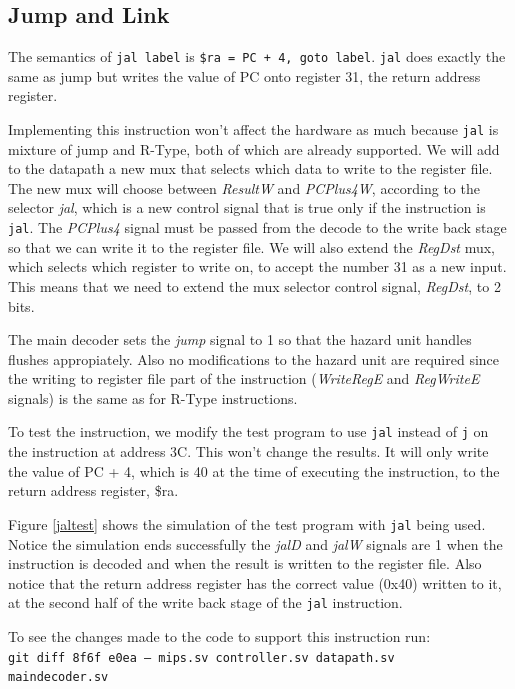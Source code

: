 \documentclass[titlepage,12pt,twoside,a4paper]{article}
\newcommand{\code}[1]{{\texttt{#1}}}
\begin{document}
\subsection{Jump and Link}
The semantics of \code{jal label} is \code{\$ra = PC + 4, goto label}. \code{jal} does exactly the same as jump but writes the value of PC onto register 31, the return address register.

Implementing this instruction won't affect the hardware as much because \code{jal} is mixture of jump and R-Type, both of which are already supported. We will add to the datapath a new mux that selects which data to write to the register file. The new mux will choose between \textit{ResultW} and \textit{PCPlus4W}, according to the selector \textit{jal}, which is a new control signal that is true only if the instruction is \code{jal}. The \textit{PCPlus4} signal must be passed from the decode to the write back stage so that we can write it to the register file. We will also extend the \textit{RegDst} mux, which selects which register to write on, to accept the number 31 as a new input. This means that we need to extend the mux selector control signal, \textit{RegDst}, to 2 bits.

The main decoder sets the \textit{jump} signal to 1 so that the hazard unit handles flushes appropiately. Also no modifications to the hazard unit are required since the writing to register file part of the instruction (\textit{WriteRegE} and \textit{RegWriteE} signals) is the same as for R-Type instructions.

To test the instruction, we modify the test program to use \code{jal} instead of \code{j} on the instruction at address 3C. This won't change the results. It will only write the value of PC + 4, which is 40 at the time of executing the instruction, to the return address register, \$ra.

Figure \ref{jaltest} shows the simulation of the test program with \code{jal} being used. Notice the simulation ends successfully the \textit{jalD} and \textit{jalW} signals are 1 when the instruction is decoded and when the result is written to the register file. Also notice that the return address register has the correct value (0x40) written to it, at the second half of the write back stage of the \code{jal} instruction.

To see the changes made to the code to support this instruction run: \\
\code{git diff 8f6f e0ea -- mips.sv controller.sv datapath.sv \\ maindecoder.sv}
\end{document}
